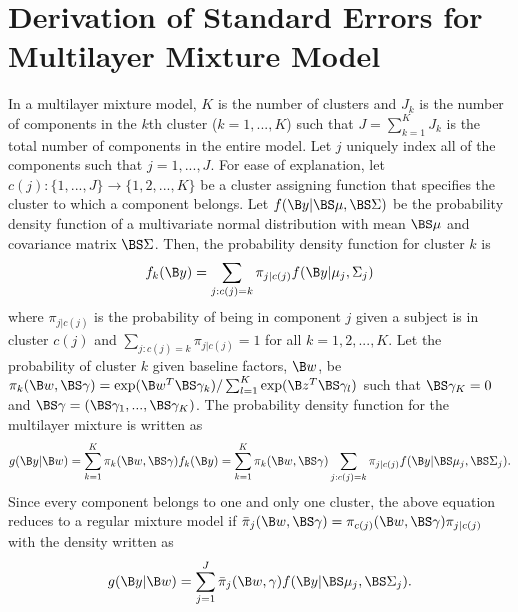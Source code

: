 \chapter{Derivation of Standard Errors for Multilayer Mixture Model}
In a multilayer mixture model, $K$ is the number of clusters and $J_{k}$ is the number of components in the $k$th cluster ($k=1,...,K$) such that $J=\sum_{k=1}^{K}J_{k}$ is the total number of components in the entire model. Let $j$ uniquely index all of the components such that $j=1,...,J$. For ease of explanation, let $c(j):\{1,...,J\}\rightarrow \{1,2,...,K\}$ be a cluster assigning function that specifies the cluster to which a component belongs. Let $f(\B y|\BS\mu,\BS\Sigma)$ be the probability density function of a multivariate normal distribution with mean $\BS\mu$ and covariance matrix $\BS\Sigma$. Then, the probability density function for cluster $k$ is
$$f_{k}(\B y) = \sum_{j: c(j) = k} \pi_{j|c(j)}f(\B y|\mu_{j},\Sigma_{j})$$
where $\pi_{j|c(j)}$ is the probability of being in component $j$ given a subject is in cluster $c(j)$ and $\sum_{j: c(j) = k}\pi_{j|c(j)}=1$ for all $k=1,2,...,K$. Let the probability of cluster $k$ given baseline factors, $\B w$, be $\pi_{k}(\B w,\BS\gamma)=\exp(\B w^{T}\BS\gamma_{k})/\sum^{K}_{l=1}\exp(\B z^{T}\BS\gamma_{l})$ such that $\BS\gamma_{K}=0$ and $\BS\gamma=(\BS\gamma_{1},...,\BS\gamma_{K})$. The probability density function for the multilayer mixture is written as
$$g(\B y|\B w) = \sum_{k=1}^{K}\pi_{k}(\B w,\BS \gamma)f_{k}(\B y) = \sum_{k=1}^{K}\pi_{k}(\B w,\BS\gamma)\sum_{j: c(j) = k} \pi_{j|c(j)}f( \B y| \BS\mu_{j},\BS\Sigma_{j}).$$
Since every component belongs to one and only one cluster, the above equation reduces to a regular mixture model if $\bar{\pi}_{j}(\B w,\BS \gamma)=\pi_{c(j)}(\B w,\BS\gamma)\pi_{j|c(j)}$ with the density written as
$$g(\B y|\B w) = \sum_{j=1}^{J}\bar{\pi}_{j}(\B w,\gamma)f(\B y|\BS \mu_{j},\BS\Sigma_{j}).$$
